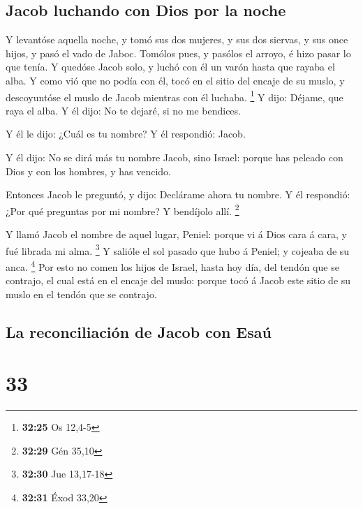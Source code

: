 \hypertarget{jacob-luchando-con-dios-por-la-noche}{%
\subsection{Jacob luchando con Dios por la
noche}\label{jacob-luchando-con-dios-por-la-noche}}

 Y levantóse aquella noche, y tomó sus dos mujeres, y sus
dos siervas, y sus once hijos, y pasó el vado de Jaboc. 
Tomólos pues, y pasólos el arroyo, é hizo pasar lo que tenía.
 Y quedóse Jacob solo, y luchó con él un varón hasta que
rayaba el alba.  Y como vió que no podía con él, tocó en
el sitio del encaje de su muslo, y descoyuntóse el muslo de Jacob
mientras con él luchaba. \footnote{\textbf{32:25} Os 12,4-5}
 Y dijo: Déjame, que raya el alba. Y él dijo: No te
dejaré, si no me bendices.

 Y él le dijo: ¿Cuál es tu nombre? Y él respondió: Jacob.

 Y él dijo: No se dirá más tu nombre Jacob, sino Israel:
porque has peleado con Dios y con los hombres, y has vencido.

 Entonces Jacob le preguntó, y dijo: Declárame ahora tu
nombre. Y él respondió: ¿Por qué preguntas por mi nombre? Y bendíjolo
allí. \footnote{\textbf{32:29} Gén 35,10}

 Y llamó Jacob el nombre de aquel lugar, Peniel: porque
vi á Dios cara á cara, y fué librada mi alma. \footnote{\textbf{32:30}
  Jue 13,17-18}  Y salióle el sol pasado que hubo á
Peniel; y cojeaba de su anca. \footnote{\textbf{32:31} Éxod 33,20}
 Por esto no comen los hijos de Israel, hasta hoy día,
del tendón que se contrajo, el cual está en el encaje del muslo: porque
tocó á Jacob este sitio de su muslo en el tendón que se contrajo.

\hypertarget{la-reconciliaciuxf3n-de-jacob-con-esauxfa}{%
\subsection{La reconciliación de Jacob con
Esaú}\label{la-reconciliaciuxf3n-de-jacob-con-esauxfa}}

\hypertarget{section-32}{%
\section{33}\label{section-32}}


